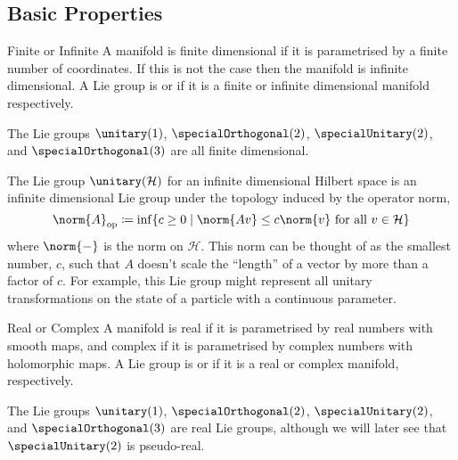 \documentclass[fleqn]{NotesClass}
\newcommand*{\hilbert}{\mathcal{H}}
\begin{document}
    \subsection{Basic Properties}
    \begin{dfn}{Finite or Infinite}{}
        A manifold is finite dimensional if it is parametrised by a finite number of coordinates.
        If this is not the case then the manifold is infinite dimensional.
        A Lie group is  or  if it is a finite or infinite dimensional manifold respectively.
    \end{dfn}
    \begin{exm}{}{}
        The Lie groups \(\unitary(1)\), \(\specialOrthogonal(2)\), \(\specialUnitary(2)\), and \(\specialOrthogonal(3)\) are all finite dimensional.
        
        The Lie group \(\unitary(\hilbert)\) for an infinite dimensional Hilbert space is an infinite dimensional Lie group under the topology induced by the operator norm,
        \begin{equation}
            \norm{A}_{\mathrm{op}} \coloneqq \inf \{c \ge 0 \mid \norm{Av} \le c\norm{v} \text{ for all } v \in \hilbert\}
        \end{equation}
        where \(\norm{-}\) is the norm on \(\hilbert\).
        This norm can be thought of as the smallest number, \(c\), such that \(A\) doesn't scale the \enquote{length} of a vector by more than a factor of \(c\).
        For example, this Lie group might represent all unitary transformations on the state of a particle with a continuous parameter.
    \end{exm}
    
    \begin{dfn}{Real or Complex}{}
        A manifold is real if it is parametrised by real numbers with smooth maps, and complex if it is parametrised by complex numbers with holomorphic maps.
        A Lie group is  or  if it is a real or complex manifold, respectively.
    \end{dfn}
    
    \begin{dfn}{}{}
        The Lie groups \(\unitary(1)\), \(\specialOrthogonal(2)\), \(\specialUnitary(2)\), and \(\specialOrthogonal(3)\) are real Lie groups, although we will later see that \(\specialUnitary(2)\) is pseudo-real.
    \end{dfn}
\end{document}
